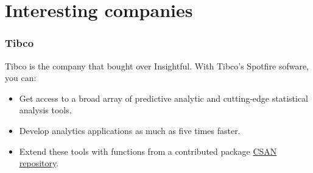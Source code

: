 \documentclass{beamer}
\begin{document}
\section{Interesting companies}
\begin{frame}[t,label=current]
  \frametitle{Tibco}
  Tibco is the company that bought over Insightful. With Tibco's Spotfire
  sofware, you can:
  \begin{itemize}
  \item Get access to a broad array of predictive analytic and cutting-edge
    statistical analysis tools.
  \item Develop analytics applications as much as five times faster.
  \item Extend these tools with functions from a contributed package 
    \href{http://csan.insightful.com}{CSAN repository}.
  \end{itemize}
\end{frame}
\end{document}

